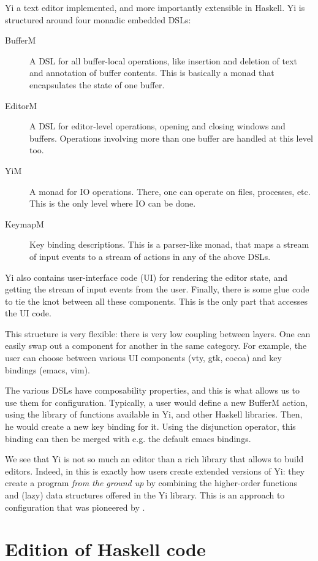 \documentclass[9pt,indentedstyle,preprint]{sigplanconf}
\begin{document}
Yi a text editor implemented, and more importantly extensible in
Haskell. Yi is structured around four monadic embedded DSLs:
\begin{description}
\item[BufferM] A DSL for all buffer-local operations, like insertion
  and deletion of text and annotation of buffer contents. This is
  basically a monad that encapsulates the state of one buffer.
\item[EditorM] A DSL for editor-level operations, opening and closing
  windows and buffers. Operations involving more than one buffer are
  handled at this level too.
\item[YiM] A monad for IO operations. There, one can operate on files,
  processes, etc.  This is the only level where IO can be done.
\item[KeymapM] Key binding descriptions. This is a parser-like monad,
  that maps a stream of input events to a stream of actions in any of
  the above DSLs.
\end{description}
Yi also contains user-interface code (UI) for rendering the editor
state, and getting the stream of input events from the user.  Finally,
there is some glue code to tie the knot between all these
components. This is the only part that accesses the UI code.

This structure is very flexible: there is very low coupling between
layers. One can easily swap out a component for another in the same
category. For example, the user can choose between various UI
components (vty, gtk, cocoa) and key bindings (emacs, vim).

The various DSLs have composability properties, and this is what
allows us to use them for configuration. Typically, a user would
define a new BufferM action, using the library of functions available
in Yi, and other Haskell libraries. Then, he would create a new
key binding for it. Using the disjunction operator, this binding can
then be merged with e.g. the default emacs bindings.

We see that Yi is not so much an editor than a rich library that
allows to build editors. Indeed, in this is exactly how users create
extended versions of Yi: they create a program {\em from the ground
  up} by combining the higher-order functions and (lazy) data
structures offered in the Yi library. This is an approach to
configuration that was pioneered by \citet{Stewart2007XMonad}.

\section{Edition of Haskell code}
\end{document}
